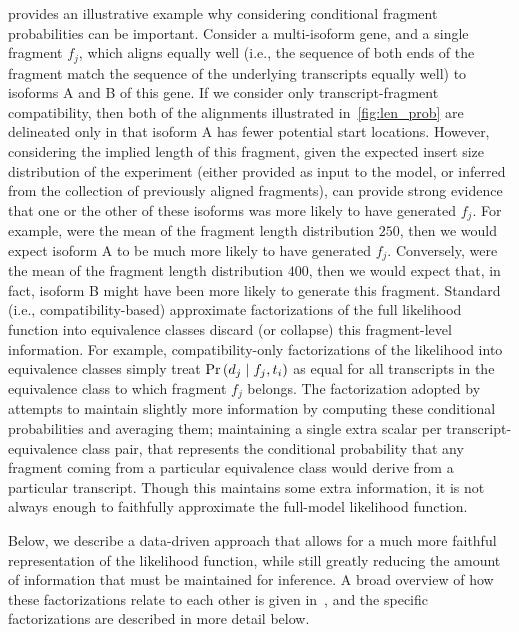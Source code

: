  provides an illustrative example why considering conditional 
fragment probabilities can be important.  Consider a multi-isoform gene, and a 
single fragment $f_j$, which aligns equally well (i.e., the sequence of both ends 
of the fragment match the sequence of the underlying transcripts equally well) to 
isoforms A and B of this gene.  If we consider only transcript-fragment compatibility, 
then both of the alignments illustrated in~\cref{fig:len_prob} are delineated only in 
that isoform A has fewer potential start locations.  However, considering the implied 
length of this fragment, given the expected insert size distribution of the experiment 
(either provided as input to the model, or inferred from the collection of previously 
aligned fragments), can provide strong evidence that one or the other of these isoforms 
was more likely to have generated $f_j$.  For example, were the mean of the fragment 
length distribution $250$, then we would expect isoform A to be much more likely to 
have generated $f_j$.  Conversely, were the mean of the fragment length distribution 
$400$, then we would expect that, in fact, isoform B might have been more likely to 
generate this fragment.  Standard (i.e., compatibility-based) approximate factorizations 
of the full likelihood function into equivalence classes discard (or collapse) this 
fragment-level information.  For example, compatibility-only factorizations of the 
likelihood into equivalence classes simply treat 
$\Pr\left( d_{j} \mid f_j, t_i\right)$ 
as equal for all transcripts in the equivalence class to which fragment $f_j$ belongs. 
The factorization adopted by \salmon attempts to maintain slightly more information by 
computing these conditional probabilities and averaging them; maintaining a single extra 
scalar per transcript-equivalence class pair, that represents the conditional probability 
that any fragment coming from a particular equivalence class would derive from a particular 
transcript.  Though this maintains some extra information, it is not always enough to 
faithfully approximate the full-model likelihood function.

Below, we describe a data-driven approach that allows for a much more faithful 
representation of the \fm likelihood function, while still greatly reducing the 
amount of information that must be maintained for inference.  A broad overview of 
how these factorizations relate to each other is given in~, and 
the specific factorizations are described in more detail below.

